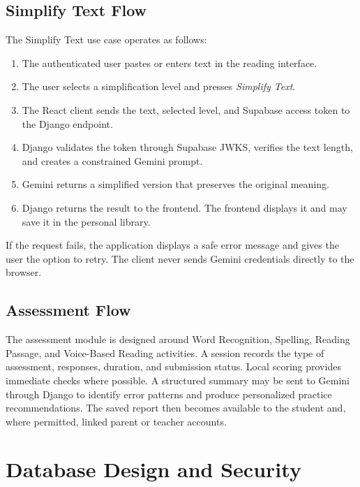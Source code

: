 \documentclass[a4paper]{tietreport}
\begin{document}
\section{Simplify Text Flow}
The Simplify Text use case operates as follows:
\begin{enumerate}
  \item The authenticated user pastes or enters text in the reading interface.
  \item The user selects a simplification level and presses \emph{Simplify Text}.
  \item The React client sends the text, selected level, and Supabase access token to the Django endpoint.
  \item Django validates the token through Supabase JWKS, verifies the text length, and creates a constrained Gemini prompt.
  \item Gemini returns a simplified version that preserves the original meaning.
  \item Django returns the result to the frontend. The frontend displays it and may save it in the personal library.
\end{enumerate}
If the request fails, the application displays a safe error message and gives the user the option to retry. The client never sends Gemini credentials directly to the browser.

\section{Assessment Flow}
The assessment module is designed around Word Recognition, Spelling, Reading Passage, and Voice-Based Reading activities. A session records the type of assessment, responses, duration, and submission status. Local scoring provides immediate checks where possible. A structured summary may be sent to Gemini through Django to identify error patterns and produce personalized practice recommendations. The saved report then becomes available to the student and, where permitted, linked parent or teacher accounts.

\chapter{Database Design and Security}
\end{document}
